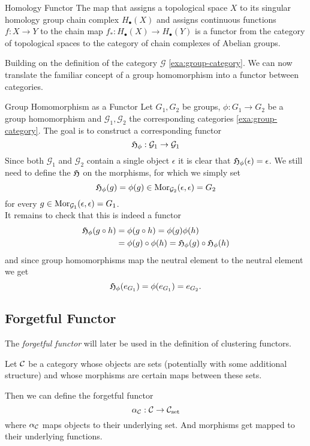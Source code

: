 \begin{example}{Homology Functor}{}
\cite{Hatcher2001}
The map that assigns a topological space $X$ to its singular homology group chain complex $H_\bullet(X)$ and assigns continuous functions $f: X \to Y$ to the chain map $f_*: H_\bullet(X) \to H_\bullet(Y)$ is a functor from the category of topological spaces to the category of chain complexes of Abelian groups.
\end{example}

Building on the definition of the category $\mathcal{G}$ \ref{exa:group-category}. We can now translate the familiar concept of a group homomorphism into a functor between categories.

\begin{example}{Group Homomorphism as a Functor}{}
Let $G_1, G_2$ be groups, $\phi: G_1 \to G_2$ be a group homomorphism and $\mathcal{G}_1,\mathcal{G}_2$ the corresponding categories \ref{exa:group-category}. The goal is to construct a corresponding functor 
$$
\mathfrak{H}_\phi: \mathcal{G}_1 \to \mathcal{G}_1
$$
Since both $\mathcal{G}_1$ and $\mathcal{G}_2$ contain a single object $\epsilon$ it is clear that $\mathfrak{H}_\phi(\epsilon) = \epsilon$. We still need to define the $\mathfrak{H}$ on the morphisms, for which we simply set
$$
\mathfrak{H}_\phi(g) = \phi(g) \in \mathrm {Mor}_{\mathcal{G}_2}(\epsilon, \epsilon) = G_2
$$
for every $g \in \mathrm {Mor}_{\mathcal{G}_1}(\epsilon, \epsilon) = G_1$. \\

It remains to check that this is indeed a functor
\begin{equation*}
\begin{split}
\mathfrak{H}_\phi(g \circ h) &= \phi(g \circ h) = \phi(g)\phi(h) \\
&= \phi(g) \circ \phi(h) = \mathfrak{H}_\phi(g) \circ \mathfrak{H}_\phi(h)
\end{split}
\end{equation*}
and since group homomorphisms map the neutral element to the neutral element we get
\begin{equation*}
\mathfrak{H}_\phi(e_{G_1}) = \phi(e_{G_1}) = e_{G_2}.
\end{equation*}
\end{example}

\subsection{Forgetful Functor}
The \emph{forgetful functor} will later be used in the definition of clustering functors.

\begin{definition}{}{}
Let $\mathcal{C}$ be a category whose objects are sets (potentially with some additional structure) and whose morphisms are certain maps between these sets.

Then we can define the forgetful functor
$$
\alpha_{\mathcal{C}}: \mathcal{C} \to \mathcal{C}_\mathrm{set}
$$
where $\alpha_{\mathcal{C}}$ maps objects to their underlying set. And morphisms get mapped to their underlying functions.
\end{definition}

